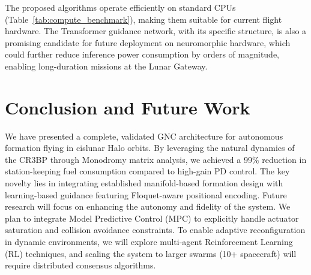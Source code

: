 \documentclass[10pt,letterpaper]{article}
\begin{document}
The proposed algorithms operate efficiently on standard CPUs (Table~\ref{tab:compute_benchmark}), making them suitable for current flight hardware. The Transformer guidance network, with its specific structure, is also a promising candidate for future deployment on neuromorphic hardware, which could further reduce inference power consumption by orders of magnitude, enabling long-duration missions at the Lunar Gateway.

\section{Conclusion and Future Work}

We have presented a complete, validated GNC architecture for autonomous formation flying in cislunar Halo orbits. By leveraging the natural dynamics of the CR3BP through Monodromy matrix analysis, we achieved a 99\% reduction in station-keeping fuel consumption compared to high-gain PD control. The key novelty lies in integrating established manifold-based formation design with learning-based guidance featuring Floquet-aware positional encoding. Future research will focus on enhancing the autonomy and fidelity of the system. We plan to integrate Model Predictive Control (MPC) to explicitly handle actuator saturation and collision avoidance constraints. To enable adaptive reconfiguration in dynamic environments, we will explore multi-agent Reinforcement Learning (RL) techniques, and scaling the system to larger swarms (10+ spacecraft) will require distributed consensus algorithms.



\end{document}
